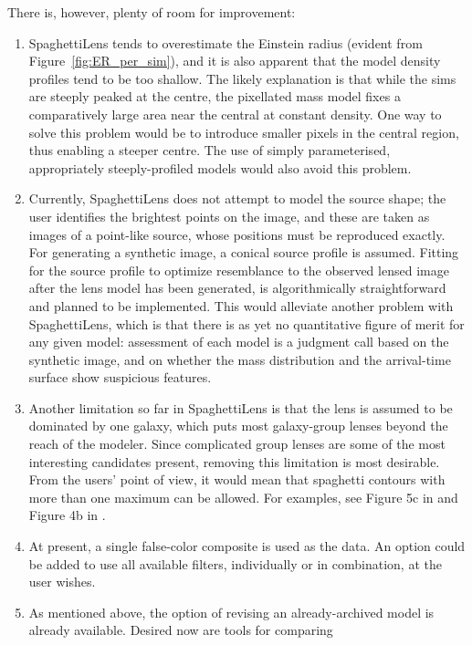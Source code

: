 \documentclass[usenatbib]{mn2e}
\newcommand{\spl}{SpaghettiLens\xspace}
\newcommand{\Figref}[1]{Figure~\ref{fig:#1}}
\begin{document}
There is, however, plenty of room for improvement:
\begin{enumerate}
\item \spl tends to overestimate the Einstein radius (evident from
  \Figref{ER_per_sim}), and it is also apparent that the model
  density profiles tend to be too shallow.  The likely explanation is
  that while the sims are steeply peaked at the centre, the pixellated
  mass model fixes a comparatively large area near the central at
  constant density.  One way to solve this problem would be to
  introduce smaller pixels in the central region, thus enabling a
  steeper centre. The use of simply parameterised, appropriately
  steeply-profiled models would also avoid this problem.
\item Currently, \spl does not attempt to model the source shape; the
  user identifies the brightest points on the image, and these are
  taken as images of a point-like source, whose positions must be
  reproduced exactly. For generating a synthetic image, a conical
  source profile is assumed. Fitting for the source profile to
  optimize resemblance to the observed lensed image after the lens
  model has been generated, is algorithmically straightforward
  \citep[cf.][]{2003ApJ...590..673W,2006MNRAS.371..983S} and planned
  to be implemented.  This would alleviate another problem with \spl,
  which is that there is as yet no quantitative figure of merit for 
  any given model: assessment of each model is a judgment call based
  on the synthetic image, and on whether the mass distribution and the
  arrival-time surface show suspicious features.
\item Another limitation so far in \spl is that the lens is assumed to
  be dominated by one galaxy, which puts most galaxy-group lenses
  beyond the reach of the modeler. Since complicated group lenses are
  some of the most interesting candidates present, removing this
  limitation is most desirable.  From the users' point of view, it
  would mean that spaghetti contours with more than one maximum can be
  allowed.  For examples, see Figure 5c in \citep{2001ApJ...557..594R}
  and Figure 4b in \cite{2003ApJ...590...39K}.
\item At present, a single false-color composite is used as the data.
  An option could be added to use all available filters, individually
  or in combination, at the user wishes. 
\item As mentioned above, the option of revising an already-archived
  model is already available.  Desired now are tools for comparing

\end{enumerate}
\end{document}
